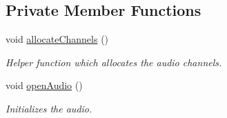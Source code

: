\subsection*{Private Member Functions}
\begin{DoxyCompactItemize}
\item 
void \hyperlink{class_drum_machine_a5a42497c3a1f390537b6c12fddab1619}{allocate\+Channels} ()
\begin{DoxyCompactList}\small\item\em Helper function which allocates the audio channels. \end{DoxyCompactList}\item 
void \hyperlink{class_drum_machine_afd65a07ff84b6c7854ddd9ee3a529382}{open\+Audio} ()
\begin{DoxyCompactList}\small\item\em Initializes the audio. \end{DoxyCompactList}\end{DoxyCompactItemize}

